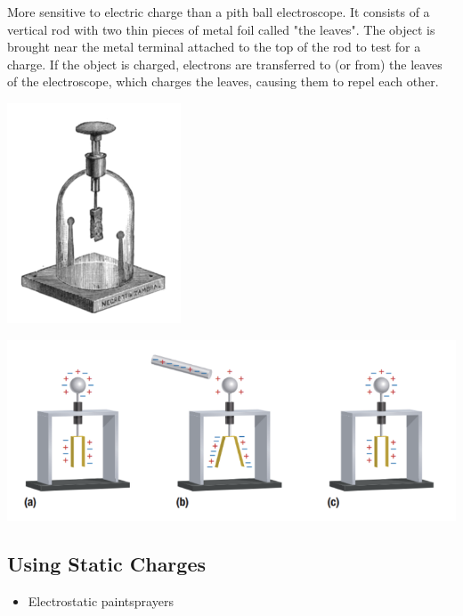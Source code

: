 \documentclass{article}
\begin{document}
        More sensitive to electric charge than a pith ball electroscope.
        It consists of a vertical rod with two thin pieces of metal foil called "the leaves". The object is brought near the metal terminal attached to the top of the rod to test for a charge. If the object is charged, electrons are transferred to (or from) the leaves of the electroscope, which charges the leaves, causing them to repel each other.
        \begin{center}
            \includegraphics[scale = 0.3]{electroscope}
        \end{center}
        \begin{center}
            \includegraphics[scale = 0.6]{metal leaf electroscope}
        \end{center}
        

    \subsection*{Using Static Charges}
    
    \begin{itemize}
        \item Electrostatic paintsprayers
    \end{itemize}

\end{document}
